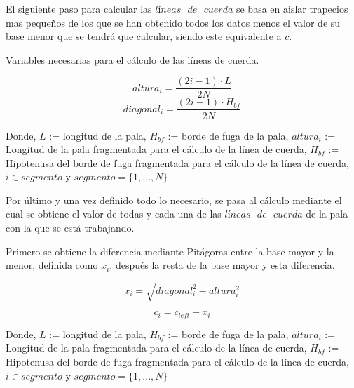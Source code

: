 El siguiente paso para calcular las $líneas \text{ } de \text{ } cuerda$ se basa en aislar trapecios mas pequeños de los que se han obtenido todos los datos menos el valor de su base menor que se tendrá que calcular, siendo este equivalente a $c$.\\

\begin{definicion}
Variables necesarias para el cálculo de las líneas de cuerda.

$$ altura_i = \dfrac{(2i - 1) \cdot L}{2N}$$
$$ diagonal_i = \dfrac{(2i - 1) \cdot H_{bf}}{2N}$$

Donde,
\centering
$L$ := longitud de la pala, $H_{bf}$ := borde de fuga de la pala, $altura_i$ := Longitud de la pala fragmentada para el cálculo de la línea de cuerda, $H_{bf}$ := Hipotenusa del borde de fuga fragmentada para el cálculo de la línea de cuerda, $i \in segmento$ y $segmento = \{1, ..., N\}$
\label{def_variables_fragmentadas}
\end{definicion}

Por último y una vez definido todo lo necesario, se pasa al cálculo mediante el cual se obtiene el valor de todas y cada una de las $líneas \text{ } de \text{ } cuerda$ de la pala con la que se está trabajando.

\begin{definicion}
Primero se obtiene la diferencia mediante Pitágoras entre la base mayor y la menor, definida como $x_i$, después la resta de la base mayor y esta diferencia.

$$ x_i = \sqrt{diagonal_i^{2} - altura_i^{2}}$$

$$ c_i = c_{left} - x_i $$

Donde,
\centering
$L$ := longitud de la pala, $H_{bf}$ := borde de fuga de la pala, $altura_i$ := Longitud de la pala fragmentada para el cálculo de la línea de cuerda, $H_{bf}$ := Hipotenusa del borde de fuga fragmentada para el cálculo de la línea de cuerda, $i \in segmento$ y $segmento = \{1, ..., N\}$
\label{def_chord_line}
\end{definicion}

